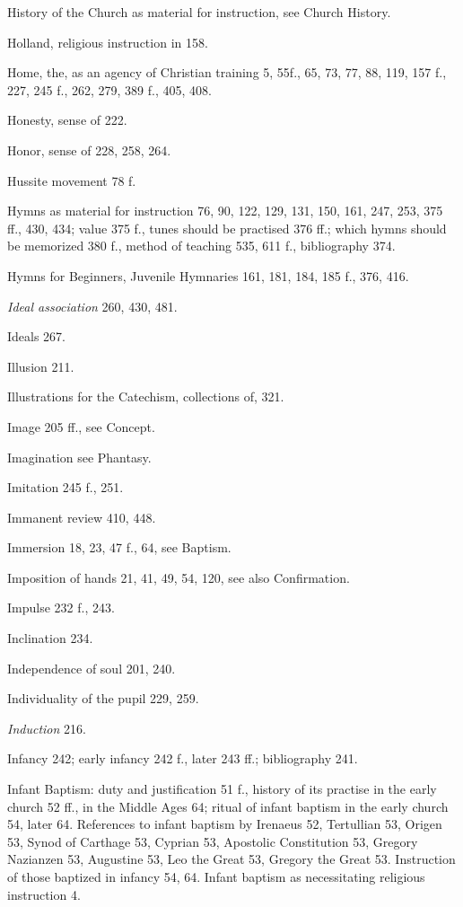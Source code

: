 History of the Church as material for instruction, see Church History.

Holland, religious instruction in 158.

Home, the, as an agency of Christian training 5, 55f., 65, 73, 77, 88, 119, 157 f., 227, 245 f., 262, 279, 389 f., 405, 408.

Honesty, sense of 222.

Honor, sense of 228, 258, 264.

Hussite movement 78 f.

Hymns as material for instruction 76, 90, 122, 129, 131, 150, 161, 247, 253, 375 ff., 430, 434; value 375 f., tunes should be practised 376 ff.; which hymns should be memorized 380 f., method of teaching 535, 611 f., bibliography 374.

Hymns for Beginners, Juvenile Hymnaries 161, 181, 184, 185 f., 376, 416.

\emph{Ideal association} 260, 430, 481.

Ideals 267.

Illusion 211.

Illustrations for the Catechism, collections of, 321.

Image 205 ff., see Concept.

Imagination see Phantasy.

Imitation 245 f., 251.

Immanent review 410, 448.

Immersion 18, 23, 47 f., 64, see Baptism.

Imposition of hands 21, 41, 49, 54, 120, see also Confirmation.

Impulse 232 f., 243.

Inclination 234.

Independence of soul 201, 240.

Individuality of the pupil 229, 259.

\emph{Induction} 216.

Infancy 242; early infancy 242 f., later 243 ff.; bibliography 241.

Infant Baptism: duty and justification 51 f., history of its practise in the early church 52 ff., in the Middle Ages 64; ritual of infant baptism in the early church 54, later 64. References to infant baptism by Irenaeus 52, Tertullian 53, Origen 53, Synod of Carthage 53, Cyprian 53, Apostolic Constitution 53, Gregory Nazianzen 53, Augustine 53, Leo the Great 53, Gregory the Great 53. Instruction of those baptized in infancy 54, 64. Infant baptism as necessitating religious instruction 4.

